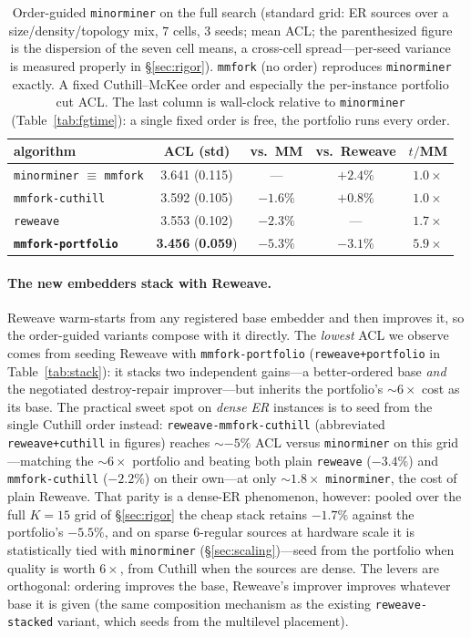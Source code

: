 \documentclass[acmsmall,anonymous,nonacm]{acmart}
\begin{document}
\begin{table}[t]
\caption{Order-guided \texttt{minorminer} on the full search (standard grid: ER
sources over a size/density/topology mix, $7$ cells, $3$ seeds; mean ACL; the
parenthesized figure is the dispersion of the seven cell means, a cross-cell
spread---per-seed variance is measured properly in \S\ref{sec:rigor}). \texttt{mmfork}
(no order) reproduces
\texttt{minorminer} exactly. A fixed Cuthill--McKee order and especially the
per-instance portfolio cut ACL. The last column is wall-clock
relative to \texttt{minorminer} (Table~\ref{tab:fgtime}): a single fixed order is
free, the portfolio runs every order.}
\label{tab:mmfork}
\small
\begin{tabular}{lcccc}
\toprule
algorithm & ACL (std) & vs.\ MM & vs.\ Reweave & $t/$MM \\
\midrule
\texttt{minorminer} $\equiv$ \texttt{mmfork} & 3.641 (0.115) & --- & $+2.4\%$ & $1.0\times$ \\
\texttt{mmfork-cuthill}    & 3.592 (0.105) & $-1.6\%$ & $+0.8\%$ & $1.0\times$ \\
\texttt{reweave}           & 3.553 (0.102) & $-2.3\%$ & --- & $1.7\times$ \\
\textbf{\texttt{mmfork-portfolio}} & \textbf{3.456} (\textbf{0.059}) & $\mathbf{-5.3\%}$ & $\mathbf{-3.1\%}$ & $5.9\times$ \\
\bottomrule
\end{tabular}
\end{table}

\paragraph{The new embedders stack with Reweave.}
Reweave warm-starts from any registered base embedder and then improves it, so the
order-guided variants compose with it directly. The \emph{lowest} ACL we observe
comes from seeding Reweave with \texttt{mmfork-portfolio} (\texttt{reweave+portfolio}
in Table~\ref{tab:stack}): it stacks two independent gains---a better-ordered base
\emph{and} the negotiated destroy-repair improver---but inherits the portfolio's
${\sim}6\times$ cost as its base. The practical sweet spot on \emph{dense ER}
instances is to seed from the single
Cuthill order instead: \texttt{reweave-mmfork-cuthill} (abbreviated
\texttt{reweave+cuthill} in figures) reaches ${\sim}{-}5\%$ ACL
versus \texttt{minorminer} on this grid---matching the ${\sim}6\times$ portfolio and
beating both
plain \texttt{reweave} ($-3.4\%$) and \texttt{mmfork-cuthill} ($-2.2\%$) on their
own---at only ${\sim}1.8\times$ \texttt{minorminer}, the cost of plain Reweave.
That parity is a dense-ER phenomenon, however: pooled over the full $K{=}15$
grid of \S\ref{sec:rigor} the cheap stack retains $-1.7\%$ against the portfolio's
$-5.5\%$, and on sparse $6$-regular sources at hardware scale it is statistically
tied with \texttt{minorminer} (\S\ref{sec:scaling})---seed from the portfolio when
quality is worth $6\times$, from Cuthill when the sources are dense. The
levers are orthogonal: ordering improves the base, Reweave's improver improves
whatever base it is given (the same composition mechanism as the existing
\texttt{reweave-stacked} variant, which seeds from the multilevel placement).
\end{document}
